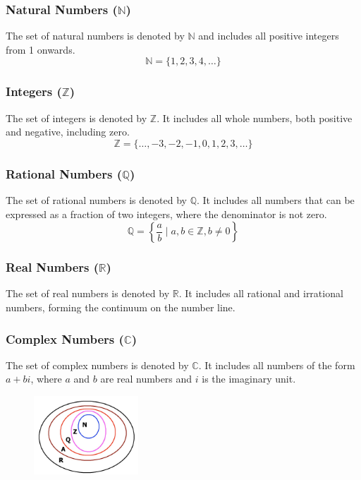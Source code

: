 \documentclass{article}
\begin{document}
\subsubsection*{Natural Numbers ($\mathbb{N}$)}
The set of natural numbers is denoted by $\mathbb{N}$ and includes all positive integers from 1 onwards. 
\[ \mathbb{N} = \{1, 2, 3, 4, \ldots\} \]

\subsubsection*{Integers ($\mathbb{Z}$)}
The set of integers is denoted by $\mathbb{Z}$. It includes all whole numbers, both positive and negative, including zero.
\[ \mathbb{Z} = \{\ldots, -3, -2, -1, 0, 1, 2, 3, \ldots\} \]

\subsubsection*{Rational Numbers ($\mathbb{Q}$)}
The set of rational numbers is denoted by $\mathbb{Q}$. It includes all numbers that can be expressed as a fraction of two integers, where the denominator is not zero.
\[ \mathbb{Q} = \left\{\frac{a}{b} \mid a,b \in \mathbb{Z}, b \neq 0\right\} \]

\subsubsection*{Real Numbers ($\mathbb{R}$)}
The set of real numbers is denoted by $\mathbb{R}$. It includes all rational and irrational numbers, forming the continuum on the number line.

\subsubsection*{Complex Numbers ($\mathbb{C}$)}
The set of complex numbers is denoted by $\mathbb{C}$. It includes all numbers of the form $a + bi$, where $a$ and $b$ are real numbers and $i$ is the imaginary unit.

\begin{figure}[ht]
    \centering
    \includegraphics[width=0.35\textwidth]{imgs/number-sets-nzqar.jpg}
    \end{figure}
\end{document}
